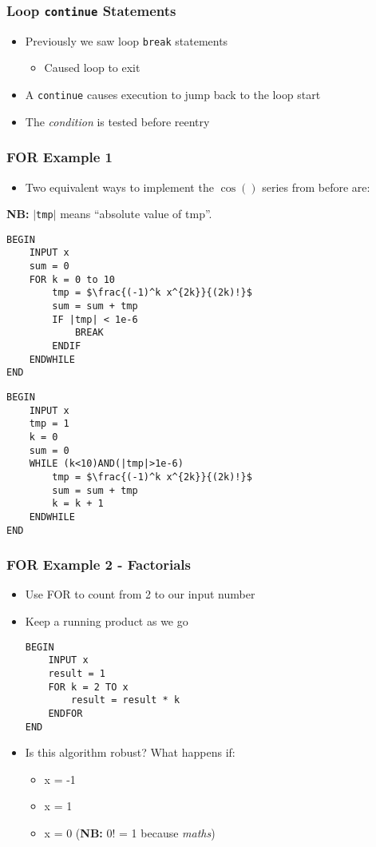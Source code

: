 \documentclass[14pt]{beamer}
\begin{document}
\begin{frame}
\frametitle{Loop \texttt{continue} Statements}
\begin{itemize}
	\item Previously we saw loop \texttt{break} statements
		\begin{itemize}
			\item Caused loop to exit
		\end{itemize}
	\item A \texttt{continue} causes execution to jump back to the loop start
	\item The \textit{condition} is tested before reentry
	
\end{itemize}
\end{frame}

\begin{frame}[fragile]
\frametitle{FOR Example 1}
\begin{itemize}
\item Two equivalent ways to implement the $\cos()$ series from before are:
\end{itemize}
{\small\textbf{NB:} $|$\texttt{tmp}$|$ means ``absolute value of tmp''.}
\begin{multicols}{2}
\begin{lstlisting}[style=pseudo,mathescape=true,basicstyle=\ttfamily\scriptsize]
BEGIN
	INPUT x
	sum = 0
	FOR k = 0 to 10
		tmp = $\frac{(-1)^k x^{2k}}{(2k)!}$
		sum = sum + tmp
		IF |tmp| < 1e-6
			BREAK
		ENDIF
	ENDWHILE 
END
\end{lstlisting}
\columnbreak
\begin{lstlisting}[style=pseudo,mathescape=true,basicstyle=\ttfamily\scriptsize]
BEGIN
	INPUT x
	tmp = 1
	k = 0
	sum = 0
	WHILE (k<10)AND(|tmp|>1e-6)
		tmp = $\frac{(-1)^k x^{2k}}{(2k)!}$
		sum = sum + tmp
		k = k + 1
	ENDWHILE 
END
\end{lstlisting}

\end{multicols}
\end{frame}

\begin{frame}[fragile]
\frametitle{FOR Example 2 - Factorials}
\begin{itemize}
\item Use FOR to count from 2 to our input number
\item Keep a running product as we go
\begin{lstlisting}[style=pseudo]
BEGIN
	INPUT x
	result = 1
	FOR k = 2 TO x
		result = result * k
	ENDFOR
END
\end{lstlisting}
\item Is this algorithm robust? What happens if:
	\begin{itemize}
		\item x = -1
		\item x = 1
		\item x = 0 (\textbf{NB:} 0! = 1 because \textit{maths})
	\end{itemize}
\end{itemize}
\end{frame}
\end{document}
